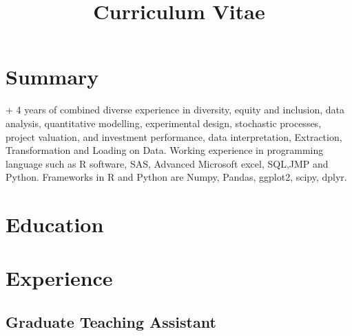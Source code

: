 \documentclass[11pt,a4paper,sans]{moderncv}\usepackage[]{graphicx}\usepackage[]{xcolor}
\title{Curriculum Vitae}
\begin{document}



\makecvtitle %
\section{Summary}

+ 4 years of combined diverse experience in diversity, equity and inclusion, data analysis, quantitative modelling, experimental design, stochastic processes, project valuation, and investment performance, data interpretation, Extraction, Transformation and Loading on Data. Working experience in programming language such as R software, SAS, Advanced Microsoft excel, SQL,JMP and Python. Frameworks in R and Python are Numpy, Pandas, ggplot2, scipy, dplyr.


\section{Education}






\section{Experience}

\subsection{Graduate Teaching Assistant}
\end{document}

